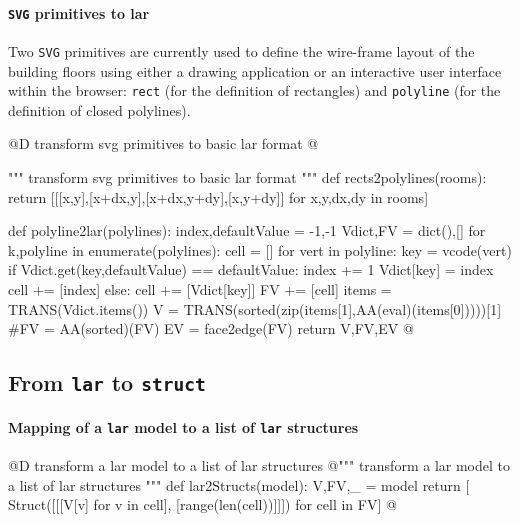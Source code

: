 \documentclass[11pt,oneside]{article}    %
\begin{document}
\paragraph{\texttt{SVG} primitives to lar}
Two \texttt{SVG} primitives are currently used to define the wire-frame layout of the building floors using either a drawing application or an interactive user interface within the browser:  \texttt{rect} (for the definition of rectangles) and \texttt{polyline} (for the definition of closed polylines). 

@D transform svg primitives to basic lar format
@{""" transform svg primitives to basic lar format """
def rects2polylines(rooms): 
    return [[[x,y],[x+dx,y],[x+dx,y+dy],[x,y+dy]] for x,y,dx,dy in rooms]
    
def polyline2lar(polylines):
    index,defaultValue = -1,-1
    Vdict,FV = dict(),[]
    for k,polyline in enumerate(polylines):
        cell = []
        for vert in polyline:
            key = vcode(vert)
            if Vdict.get(key,defaultValue) == defaultValue:
                index += 1
                Vdict[key] = index
                cell += [index]
            else: 
                cell += [Vdict[key]]
        FV += [cell]
    items = TRANS(Vdict.items())
    V = TRANS(sorted(zip(items[1],AA(eval)(items[0]))))[1]
    #FV = AA(sorted)(FV)
    EV = face2edge(FV)
    return V,FV,EV
@}


\subsection{From \texttt{lar} to \texttt{struct}}


\paragraph{Mapping of a \texttt{lar} model to a list of \texttt{lar} structures}

@D transform a lar model to a list of lar structures
@{""" transform a lar model to a list of lar structures """
def lar2Structs(model):
   V,FV,_ = model
   return [ Struct([[[V[v] for v in cell], [range(len(cell))]]]) for cell in FV]
@}
\end{document}
